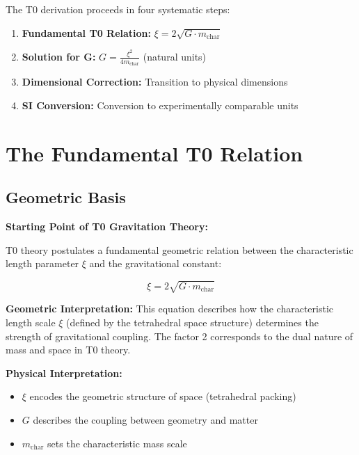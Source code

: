 	The T0 derivation proceeds in four systematic steps:
	
	\begin{enumerate}
		\item \textbf{Fundamental T0 Relation:} $\xi = 2\sqrt{G \cdot m_{\text{char}}}$
		\item \textbf{Solution for G:} $G = \frac{\xi^2}{4m_{\text{char}}}$ (natural units)
		\item \textbf{Dimensional Correction:} Transition to physical dimensions
		\item \textbf{SI Conversion:} Conversion to experimentally comparable units
	\end{enumerate}
	
	\section{The Fundamental T0 Relation}
	
	\subsection{Geometric Basis}
	
	\begin{derivation}
		\textbf{Starting Point of T0 Gravitation Theory:}
		
		T0 theory postulates a fundamental geometric relation between the characteristic length parameter $\xi$ and the gravitational constant:
		
		\begin{equation}
			\xi = 2\sqrt{G \cdot m_{\text{char}}}
			\label{eq:t0_fundamental}
		\end{equation}
		
		\textbf{Geometric Interpretation:} 
		This equation describes how the characteristic length scale $\xi$ (defined by the tetrahedral space structure) determines the strength of gravitational coupling. The factor 2 corresponds to the dual nature of mass and space in T0 theory.
		
		\textbf{Physical Interpretation:}
		\begin{itemize}
			\item $\xi$ encodes the geometric structure of space (tetrahedral packing)
			\item $G$ describes the coupling between geometry and matter  
			\item $m_{\text{char}}$ sets the characteristic mass scale
		\end{itemize}
	\end{derivation}
	
